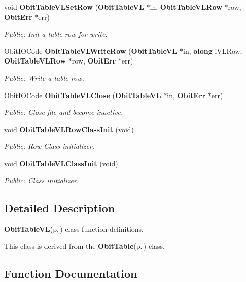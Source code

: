 \begin{CompactItemize}
void {\bf Obit\-Table\-VLSet\-Row} ({\bf Obit\-Table\-VL} $\ast$in, {\bf Obit\-Table\-VLRow} $\ast$row, {\bf Obit\-Err} $\ast$err)
\begin{CompactList}\small\item\em Public: Init a table row for write. \item\end{CompactList}\item 
Obit\-IOCode {\bf Obit\-Table\-VLWrite\-Row} ({\bf Obit\-Table\-VL} $\ast$in, {\bf olong} i\-VLRow, {\bf Obit\-Table\-VLRow} $\ast$row, {\bf Obit\-Err} $\ast$err)
\begin{CompactList}\small\item\em Public: Write a table row. \item\end{CompactList}\item 
Obit\-IOCode {\bf Obit\-Table\-VLClose} ({\bf Obit\-Table\-VL} $\ast$in, {\bf Obit\-Err} $\ast$err)
\begin{CompactList}\small\item\em Public: Close file and become inactive. \item\end{CompactList}\item 
void {\bf Obit\-Table\-VLRow\-Class\-Init} (void)
\begin{CompactList}\small\item\em Public: Row Class initializer. \item\end{CompactList}\item 
void {\bf Obit\-Table\-VLClass\-Init} (void)
\begin{CompactList}\small\item\em Public: Class initializer. \item\end{CompactList}\end{CompactItemize}


\subsection{Detailed Description}
{\bf Obit\-Table\-VL}{\rm (p.\,\pageref{structObitTableVL})} class function definitions. 

This class is derived from the {\bf Obit\-Table}{\rm (p.\,\pageref{structObitTable})} class.

\subsection{Function Documentation}
